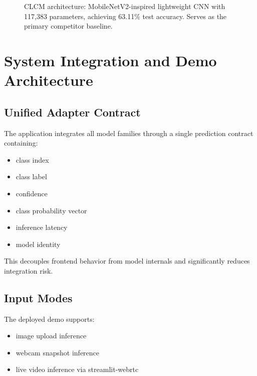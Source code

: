 \documentclass[12pt,a4paper]{article}
\begin{document}
\begin{figure}[h!]
{}
    \caption{CLCM architecture: MobileNetV2-inspired lightweight CNN with 117,383 parameters, achieving 63.11\% test accuracy. Serves as the primary competitor baseline.}
    \label{fig:clcm_arch}
\end{figure}

\section{System Integration and Demo Architecture}

\subsection{Unified Adapter Contract}
The application integrates all model families through a single prediction contract containing:
\begin{itemize}[leftmargin=*]
    \item class index
    \item class label
    \item confidence
    \item class probability vector
    \item inference latency
    \item model identity
\end{itemize}
This decouples frontend behavior from model internals and significantly reduces integration risk.

\subsection{Input Modes}
The deployed demo supports:
\begin{itemize}[leftmargin=*]
    \item image upload inference
    \item webcam snapshot inference
    \item live video inference via streamlit-webrtc
\end{itemize}
\end{document}
